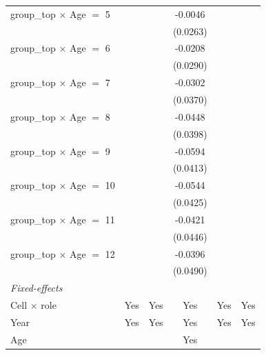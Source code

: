 \begin{table}[htbp]
\begin{tabular}{lccccc}
      group\_top $\times$ Age $=$ 5    &               &          & -0.0046  &          &   \\   
                                       &               &          & (0.0263) &          &   \\   
      group\_top $\times$ Age $=$ 6    &               &          & -0.0208  &          &   \\   
                                       &               &          & (0.0290) &          &   \\   
      group\_top $\times$ Age $=$ 7    &               &          & -0.0302  &          &   \\   
                                       &               &          & (0.0370) &          &   \\   
      group\_top $\times$ Age $=$ 8    &               &          & -0.0448  &          &   \\   
                                       &               &          & (0.0398) &          &   \\   
      group\_top $\times$ Age $=$ 9    &               &          & -0.0594  &          &   \\   
                                       &               &          & (0.0413) &          &   \\   
      group\_top $\times$ Age $=$ 10   &               &          & -0.0544  &          &   \\   
                                       &               &          & (0.0425) &          &   \\   
      group\_top $\times$ Age $=$ 11   &               &          & -0.0421  &          &   \\   
                                       &               &          & (0.0446) &          &   \\   
      group\_top $\times$ Age $=$ 12   &               &          & -0.0396  &          &   \\   
                                       &               &          & (0.0490) &          &   \\   
      \midrule
      \emph{Fixed-effects}\\
      Cell $\times$ role               & Yes           & Yes      & Yes      & Yes      & Yes\\  
      Year                             & Yes           & Yes      & Yes      & Yes      & Yes\\  
      Age                              &               &          & Yes      &          & \\  

\end{tabular}
\end{table}
